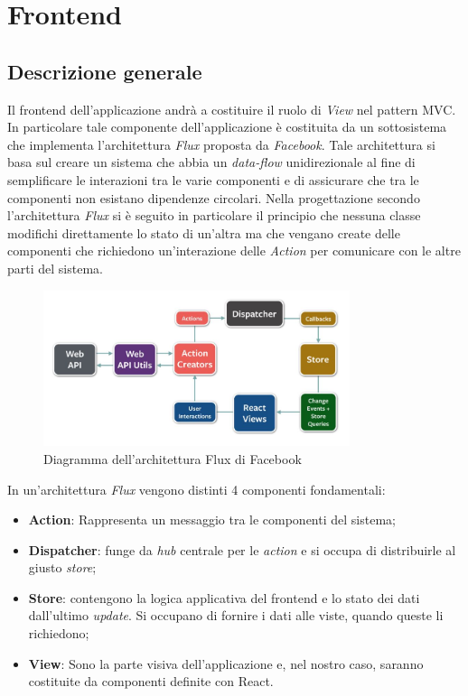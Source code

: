 \section{Frontend}

\subsection{Descrizione generale}

Il frontend dell'applicazione andrà a costituire il ruolo di \textit{View} nel pattern MVC. In particolare tale componente dell'applicazione è costituita da un sottosistema che implementa l'architettura \textit{Flux} proposta da \textit{Facebook}. Tale architettura si basa sul creare un sistema che abbia un \textit{data-flow} unidirezionale al fine di semplificare le interazioni tra le varie componenti e di assicurare che tra le componenti non esistano dipendenze circolari.
Nella progettazione secondo l'architettura \textit{Flux} si è seguito in particolare il principio che nessuna classe modifichi direttamente lo stato di un'altra ma che vengano create delle componenti che richiedono un'interazione delle \textit{Action} per comunicare con le altre parti del sistema.

\begin{figure}[h]
\centering
\includegraphics[width=0.8\textwidth]{res/sections/imgs/flux.jpg}
\caption{Diagramma dell'architettura Flux di Facebook}
\end{figure}
In un'architettura \textit{Flux} vengono distinti 4 componenti fondamentali:

\begin{itemize}
\item \textbf{Action}: Rappresenta un messaggio tra le componenti del sistema;
\item \textbf{Dispatcher}: funge da \textit{hub} centrale per le \textit{action} e si occupa di distribuirle al giusto \textit{store};
\item \textbf{Store}: contengono la logica applicativa del frontend e lo stato dei dati dall'ultimo \textit{update}. Si occupano di fornire i dati alle viste, quando queste li richiedono;
\item \textbf{View}: Sono la parte visiva dell'applicazione e, nel nostro caso, saranno costituite da componenti definite con React.
\end{itemize}

